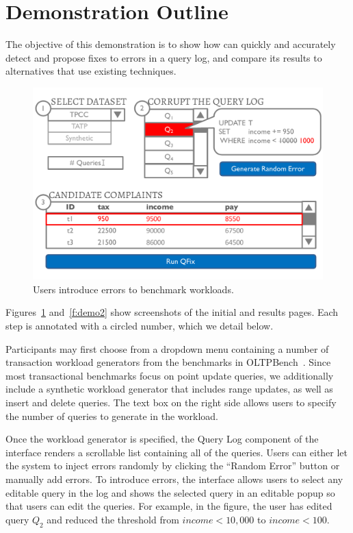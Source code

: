 \section{Demonstration Outline}
\label{sec:demo}

The objective of this demonstration is to show how \sys can quickly and accurately detect 
and propose fixes to errors in a query log, and compare its results to alternatives
that use existing techniques.


\begin{figure}[t]
\centering
  \includegraphics[width = .9\columnwidth]{figures/demo1_exp2}
  \vspace*{-0.2in}
  \caption{Users introduce errors to benchmark workloads.}
  \label{f:demo1} 
  \vspace*{-0.25in}
\end{figure}

Figures~\ref{f:demo1} and~\ref{f:demo2} show screenshots of the initial and results pages.
Each step is annotated with a circled number, which we detail below.

 Participants may first choose from a dropdown menu containing
a number of transaction workload generators from the benchmarks in OLTPBench~\cite{oltpbench}.
Since most transactional benchmarks focus on point update queries, we additionally include a 
synthetic workload generator that includes range updates, as well as insert and delete queries.
The text box on the right side allows users to specify the number of queries to generate
in the workload.  

Once the workload generator is specified, the Query Log component of the interface
renders a scrollable list containing all of the queries.  Users can either let the system to 
inject errors randomly by clicking the ``Random Error'' button or manually add errors. 
To introduce errors, the interface allows users to select any editable query in the log and shows the 
selected query in an editable popup so that users can edit the queries.  
For example, in the figure, the user has edited query $Q_2$ and reduced the threshold from 
$income < 10,000$ to $income < 100$.

